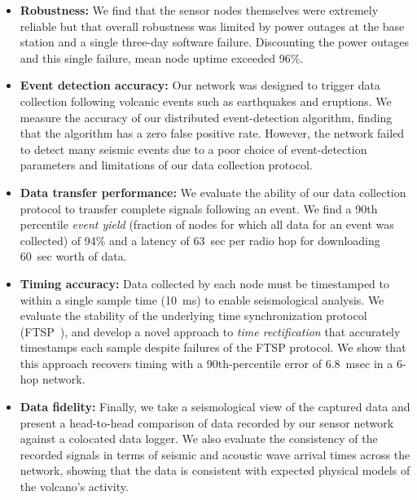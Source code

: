 \begin{itemize}

\item \textbf{Robustness:} We find that the sensor nodes themselves were
extremely reliable but that overall robustness was limited by power outages
at the base station and a single three-day software failure. Discounting the
power outages and this single failure, mean node uptime exceeded 96\%.

\item \textbf{Event detection accuracy:} Our network was designed to trigger
data collection following volcanic events such as earthquakes and eruptions.
We measure the accuracy of our distributed event-detection algorithm, finding
that the algorithm has a zero false positive rate. However, the network
failed to detect many seismic events due to a poor choice of event-detection
parameters and limitations of our data collection protocol.

\item \textbf{Data transfer performance:} We evaluate the ability of our data
collection protocol to transfer complete signals following an event. We find
a 90th percentile \textit{event yield} (fraction of nodes for which all data
for an event was collected) of 94\% and a latency of 63~sec per radio hop for
downloading 60~sec worth of data.

\item \textbf{Timing accuracy:} Data collected by each node must be
timestamped to within a single sample time (10~ms) to enable seismological
analysis. We evaluate the stability of the underlying time synchronization
protocol (FTSP~\cite{ftsp}), and develop a novel approach to \textit{time
rectification} that accurately timestamps each sample despite failures of the
FTSP protocol. We show that this approach recovers timing with a
90th-percentile error of 6.8~msec in a 6-hop network.

\item \textbf{Data fidelity:} Finally, we take a seismological view of the
captured data and present a head-to-head comparison of data recorded by our
sensor network against a colocated data logger. We also evaluate the
consistency of the recorded signals in terms of seismic and acoustic wave
arrival times across the network, showing that the data is consistent with
expected physical models of the volcano's activity.

\end{itemize}


